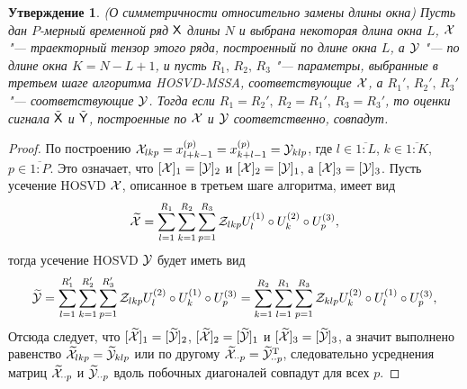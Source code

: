 \documentclass[specialist,
    substylefile = spbu_report.rtx,
    subf,href,colorlinks=true, 12pt]{disser}
\theoremstyle{plain}
\newtheorem{statement}{Утверждение}[section]
\theoremstyle{definition}
\theoremstyle{remark}
\begin{document}
    \begin{statement}
        \emph{(О симметричности относительно замены длины окна)}
        Пусть дан $P$-мерный временной ряд $\mathsf{X}$ длины $N$ и выбрана некоторая длина окна $L$,
        $\mathcal{X}$ "--- траекторный тензор этого ряда, построенный по длине окна $L$, а
        $\mathcal{Y}$ "--- по длине окна ${K = N - L + 1}$, и пусть
        $R_1,\, R_2,\, R_3$ "--- параметры, выбранные в третьем шаге алгоритма \emph{HOSVD-MSSA}, соответствующие $\mathcal{X}$,
        а $R_1',\, R_2',\, R_3'$ "--- соответствующие $\mathcal{Y}$.
        Тогда если $R_1 = R_2',\, R_2 = R_1',\,  R_3 = R_3'$, то
        оценки сигнала $\tilde{\mathsf{X}}$ и $\tilde{\mathsf{Y}}$, построенные по $\mathcal{X}$ и $\mathcal{Y}$ соответственно,
        совпадут.
    \end{statement}
    \begin{proof}
        По построению $\mathcal{X}_{lkp} = x_{l+k-1}^{(p)} = x_{k+l-1}^{(p)} = \mathcal{Y}_{klp}$, где ${l\in \overline{1:L}}$,
        ${k \in \overline{1:K}}$, ${p\in \overline{1:P}}$.
        Это означает, что $[\mathcal{X}]_1 = [\mathcal{Y}]_2$ и $[\mathcal{X}]_2 = [\mathcal{Y}]_1$, а $[\mathcal{X}]_3 = [\mathcal{Y}]_3$.
        Пусть усечение HOSVD $\mathcal{X}$, описанное в третьем шаге алгоритма, имеет вид
        \[
            \widetilde{\mathcal{X}} = \sum_{l=1}^{R_1} \sum_{k=1}^{R_2} \sum_{p=1}^{R_3}
            \mathcal{Z}_{lkp} U_l^{(1)}\circ U_k^{(2)} \circ U_p^{(3)},
        \]
        тогда усечение HOSVD $\mathcal{Y}$ будет иметь вид
        \[
            \widetilde{\mathcal{Y}} = \sum_{l=1}^{R_1'} \sum_{k=1}^{R_2'} \sum_{p=1}^{R_3'}
            \mathcal{Z}_{lkp} U_l^{(2)}\circ U_k^{(1)} \circ U_p^{(3)}
            = \sum_{k=1}^{R_2} \sum_{l=1}^{R_1} \sum_{p=1}^{R_3}
            \mathcal{Z}_{klp} U_k^{(2)}\circ U_l^{(1)} \circ U_p^{(3)},
        \]
        Отсюда следует, что $[\widetilde{\mathcal{X}}]_1 = [\widetilde{\mathcal{Y}}]_2$, 
        $[\widetilde{\mathcal{X}}]_2 = [\widetilde{\mathcal{Y}}]_1$ и
        $[\widetilde{\mathcal{X}}]_3 = [\widetilde{\mathcal{Y}}]_3$, а значит выполнено равенство
        $\widetilde{\mathcal{X}}_{lkp}=\widetilde{\mathcal{Y}}_{klp}$ или по другому $\widetilde{\mathcal{X}}_{\cdot \cdot p} = \widetilde{\mathcal{Y}}_{\cdot \cdot p}^{\mathrm{T}}$,
        следовательно усреднения матриц $\widetilde{\mathcal{X}}_{\cdot \cdot p}$ и $\widetilde{\mathcal{Y}}_{\cdot \cdot p}$ вдоль побочных диагоналей совпадут
        для всех $p$.
    \end{proof}
\end{document}
